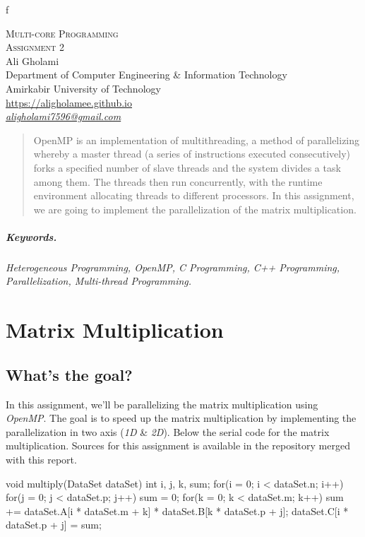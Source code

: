 f\documentclass[12pt]{article}
\numberwithin{equation}{section}
\numberwithin{table}{section}
\numberwithin{figure}{section}
\begin{document}

\begin{center}
\textsc{\Huge Multi-core Programming} \\[2pt]
	\textsc{\Large Assignment 2}\\
	\vspace{0.5cm}
  Ali Gholami \\[6pt]
  Department of Computer Engineering \& Information Technology\\
  Amirkabir University of Technology  \\[6pt]
  \def\UrlFont{\em}
  \url{https://aligholamee.github.io}\\
\href{mailto:aligholami7596@gmail.com}{\textit{aligholami7596@gmail.com}}
\end{center}

\begin{abstract}
OpenMP is an implementation of multithreading, a method of parallelizing whereby a master thread (a series of instructions executed consecutively) forks a specified number of slave threads and the system divides a task among them. The threads then run concurrently, with the runtime environment allocating threads to different processors. In this assignment, we are going to implement the parallelization of the matrix multiplication.
\end{abstract} 

\subparagraph{Keywords.} \textit{Heterogeneous Programming, OpenMP, C Programming, C++ Programming, Parallelization, Multi-thread Programming.}

\section{Matrix Multiplication}
\subsection{What's the goal?}
In this assignment, we'll be parallelizing the matrix multiplication using \textit{OpenMP}. The goal is to speed up the matrix multiplication by implementing the parallelization in two axis (\textit{1D} \& \textit{2D}). Below the serial code for the matrix multiplication. Sources for this assignment is available in the repository merged with this report.

\begin{cpp}
		void multiply(DataSet dataSet){
			int i, j, k, sum;
			for(i = 0; i < dataSet.n; i++){
				for(j = 0; j < dataSet.p; j++){
					sum = 0;
					for(k = 0; k < dataSet.m; k++){
						sum += dataSet.A[i * dataSet.m + k] * dataSet.B[k * dataSet.p + j];
					}
					dataSet.C[i * dataSet.p + j] = sum;
				}
			}
		}
\end{cpp}
\end{document}
